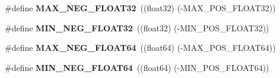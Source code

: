 \begin{DoxyCompactItemize}
\item 
\#define {\bfseries M\-A\-X\-\_\-\-N\-E\-G\-\_\-\-F\-L\-O\-A\-T32}~((float32) (-\/M\-A\-X\-\_\-\-P\-O\-S\-\_\-\-F\-L\-O\-A\-T32))\label{prim__type_8h_a28dec1bda2ada96d7126ef83feae2845}

\item 
\#define {\bfseries M\-I\-N\-\_\-\-N\-E\-G\-\_\-\-F\-L\-O\-A\-T32}~((float32) (-\/M\-I\-N\-\_\-\-P\-O\-S\-\_\-\-F\-L\-O\-A\-T32))\label{prim__type_8h_a98d8dffc8bc9036591980531b57e7f19}

\item 
\#define {\bfseries M\-A\-X\-\_\-\-N\-E\-G\-\_\-\-F\-L\-O\-A\-T64}~((float64) (-\/M\-A\-X\-\_\-\-P\-O\-S\-\_\-\-F\-L\-O\-A\-T64))\label{prim__type_8h_acb6f44b9148976581d01ab2e1313c635}

\item 
\#define {\bfseries M\-I\-N\-\_\-\-N\-E\-G\-\_\-\-F\-L\-O\-A\-T64}~((float64) (-\/M\-I\-N\-\_\-\-P\-O\-S\-\_\-\-F\-L\-O\-A\-T64))\label{prim__type_8h_a2e65d00cc854972aae6f58d9cb7d383f}

\end{DoxyCompactItemize}
